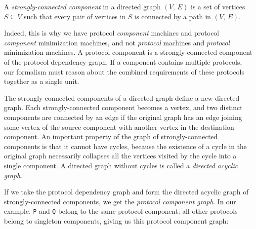 \documentclass[../generics]{subfiles}
\begin{document}
%
%
%
%
\begin{definition}
A \emph{strongly-connected component} in a directed graph $(V,\, E)$ is a set of vertices $S\subseteq V$ such that every pair of vertices in $S$ is connected by a path in $(V,\, E)$.
\end{definition}
Indeed, this is why we have protocol \emph{component} machines and protocol \emph{component} minimization machines, and not \emph{protocol} machines and \emph{protocol} minimization machines. A protocol component is a strongly-connected component of the protocol dependency graph. If a component contains multiple protocols, our formalism must reason about the combined requirements of these protocols together as a single unit.

The strongly-connected components of a directed graph define a new directed graph. Each strongly-connected component becomes a vertex, and two distinct components are connected by an edge if the original graph has an edge joining some vertex of the source component with another vertex in the destination component. An important property of the graph of strongly-connected components is that it cannot have cycles, because the existence of a cycle in the original graph necessarily collapses all the vertices visited by the cycle into a single component. A directed graph without cycles is called a \emph{directed acyclic graph}.

If we take the protocol dependency graph and form the directed acyclic graph of strongly-connected components, we get the \emph{protocol component graph}. In our example, \texttt{P} and \texttt{Q} belong to the same protocol component; all other protocols belong to singleton components, giving us this protocol component graph:
\begin{quote}
\end{quote}
\end{document}
